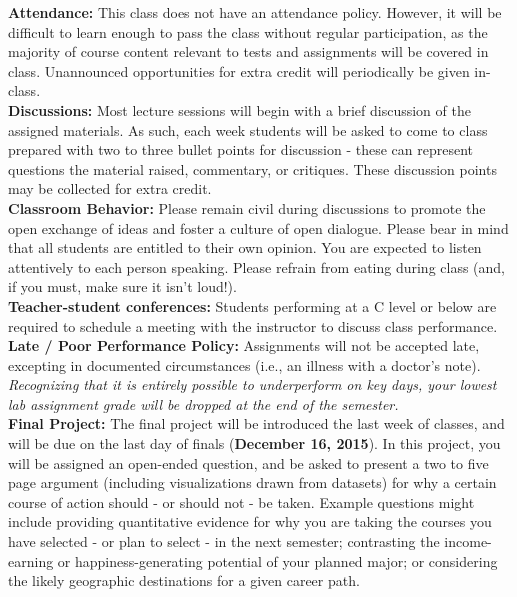 \documentclass[11pt]{article}
\begin{document}
\textbf {\large Attendance:} This class does not have an attendance policy.  However, it will be difficult to learn enough to pass the class without regular participation, as the majority of course content relevant to tests and assignments will be covered in class.  Unannounced opportunities for extra credit will periodically be given in-class.\\

\textbf {\large Discussions:} Most lecture sessions will begin with a brief discussion of the assigned materials.  As such, each week students will be asked to come to class prepared with two to three bullet points for discussion - these can represent questions the material raised, commentary, or critiques.  These discussion points may be collected for extra credit.\\

\textbf {\large Classroom Behavior:} Please remain civil during discussions to promote the open exchange of ideas and foster a culture of open dialogue.  Please bear in mind that all students are entitled to their own opinion.  You are expected to listen attentively to each person speaking.  Please refrain from eating during class (and, if you must, make sure it isn't loud!).\\

\textbf {\large Teacher-student conferences:} Students performing at a C level or below are required to schedule a meeting with the instructor to discuss class performance.\\

\textbf {\large Late / Poor Performance Policy:} Assignments will not be accepted late, excepting in documented circumstances (i.e., an illness with a doctor's note).  \textit{Recognizing that it is entirely possible to underperform on key days, your lowest lab assignment grade will be dropped at the end of the semester.}\\

\textbf {\large Final Project:} The final project will be introduced the last week of classes, and will be due on the last day of finals (\textbf{December 16, 2015}). In this project, you will be assigned an open-ended question, and be asked to present a two to five page argument (including visualizations drawn from datasets) for why a certain course of action should - or should not - be taken. Example questions might include providing quantitative evidence for why you are taking the courses you have selected - or plan to select - in the next semester; contrasting the income-earning or happiness-generating potential of your planned major; or considering the likely geographic destinations for a given career path. \\
\end{document}
